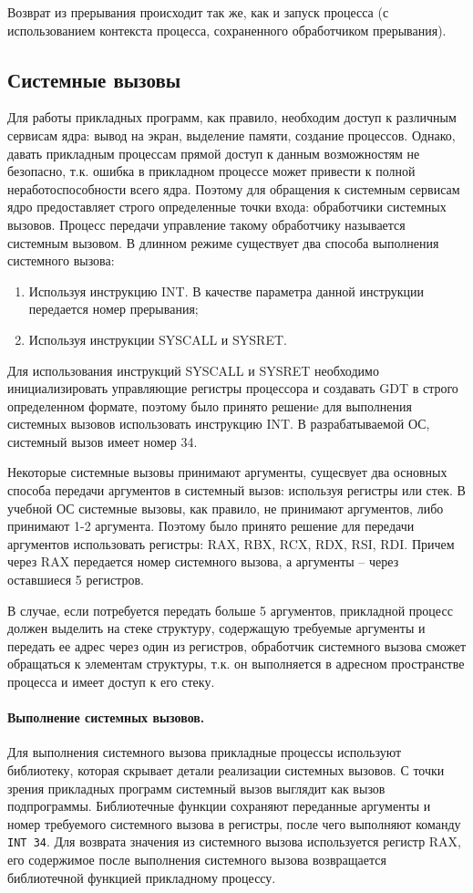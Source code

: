 Возврат из прерывания происходит так же, как и запуск процесса (с использованием контекста процесса,
сохраненного обработчиком прерывания).


\subsection{Системные вызовы}
Для работы прикладных программ, как правило, необходим доступ к различным сервисам ядра: вывод
на экран, выделение памяти, создание процессов. Однако, давать прикладным процессам прямой доступ
к данным возможностям не безопасно, т.к. ошибка в прикладном процессе может привести к полной
неработоспособности всего ядра. Поэтому для обращения к системным сервисам ядро предоставляет
строго определенные точки входа: обработчики системных вызовов. Процесс передачи управление
такому обработчику называется системным вызовом. В длинном режиме существует два способа
выполнения системного вызова:
\begin{enumerate}[1.]
\item Используя инструкцию INT. В качестве параметра данной инструкции передается номер прерывания;
\item Используя инструкции SYSCALL и SYSRET.
\end{enumerate}

Для использования инструкций SYSCALL и SYSRET необходимо инициализировать управляющие регистры
процессора и создавать GDT в строго определенном формате, поэтому было принято решениe для
выполнения системных вызовов использовать инструкцию INT. В разрабатываемой ОС, системный вызов
имеет номер 34.

Некоторые системные вызовы принимают аргументы, сущесвует два основных способа передачи
аргументов в системный вызов: используя регистры или стек. В учебной ОС системные вызовы,
как правило, не принимают аргументов, либо принимают 1-2 аргумента. Поэтому было принято
решение для передачи аргументов использовать регистры: RAX, RBX, RCX, RDX, RSI, RDI.
Причем через RAX передается номер системного вызова, а аргументы -- через оставшиеся 5 регистров.

В случае, если потребуется передать больше 5 аргументов, прикладной процесс должен выделить
на стеке структуру, содержащую требуемые аргументы и передать ее адрес через один из регистров,
обработчик системного вызова сможет обращаться к элементам структуры, т.к. он выполняется в адресном
пространстве процесса и имеет доступ к его стеку.

\paragraph{Выполнение системных вызовов.}
Для выполнения системного вызова прикладные процессы используют библиотеку, которая
скрывает детали реализации системных вызовов. С точки зрения прикладных программ системный
вызов выглядит как вызов подпрограммы. Библиотечные функции сохраняют переданные аргументы и
номер требуемого системного вызова в регистры, после чего выполняют команду \texttt{INT 34}.
Для возврата значения из системного вызова используется регистр RAX, его содержимое после
выполнения системного вызова возвращается библиотечной функцией прикладному процессу.

